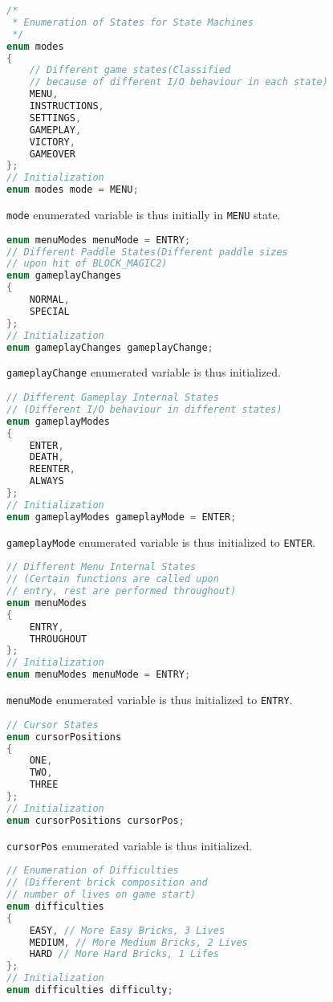 \documentclass{article}
\begin{document}
  \begin{lstlisting}[basicstyle = \small, language = C]
/*
 * Enumeration of States for State Machines
 */
enum modes
{
    // Different game states(Classified 
    // because of different I/O behaviour in each state)
    MENU,
    INSTRUCTIONS,
    SETTINGS,
    GAMEPLAY,
    VICTORY,
    GAMEOVER
};
// Initialization
enum modes mode = MENU;
  \end{lstlisting}
  \texttt{mode} enumerated variable is thus initially in \texttt{MENU} state.
    \begin{lstlisting}[basicstyle = \small, language = C]
enum menuModes menuMode = ENTRY;
// Different Paddle States(Different paddle sizes 
// upon hit of BLOCK_MAGIC2)
enum gameplayChanges
{
    NORMAL,
    SPECIAL
};
// Initialization
enum gameplayChanges gameplayChange;
  \end{lstlisting}
\texttt{gameplayChange} enumerated variable is thus initialized.
\begin{lstlisting}[basicstyle = \small, language = C]
// Different Gameplay Internal States
// (Different I/O behaviour in different states)
enum gameplayModes
{
    ENTER,
    DEATH,
    REENTER,
    ALWAYS
};
// Initialization
enum gameplayModes gameplayMode = ENTER;
  \end{lstlisting}
    \texttt{gameplayMode} enumerated variable is thus initialized to \texttt{ENTER}.
\begin{lstlisting}[basicstyle = \small, language = C]
// Different Menu Internal States
// (Certain functions are called upon 
// entry, rest are performed throughout)
enum menuModes
{
    ENTRY,
    THROUGHOUT
};
// Initialization
enum menuModes menuMode = ENTRY;
  \end{lstlisting}
    \texttt{menuMode} enumerated variable is thus initialized to \texttt{ENTRY}.
\begin{lstlisting}[basicstyle = \small, language = C]
// Cursor States
enum cursorPositions
{
    ONE,
    TWO,
    THREE
};
// Initialization
enum cursorPositions cursorPos;
  \end{lstlisting}
    \texttt{cursorPos} enumerated variable is thus initialized.
        \begin{lstlisting}[basicstyle = \small, language = C]
// Enumeration of Difficulties
// (Different brick composition and 
// number of lives on game start)
enum difficulties
{
    EASY, // More Easy Bricks, 3 Lives
    MEDIUM, // More Medium Bricks, 2 Lives
    HARD // More Hard Bricks, 1 Lifes
};
// Initialization
enum difficulties difficulty;
  \end{lstlisting}
\end{document}
